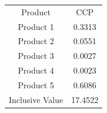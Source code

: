 \begin{tabular}{cc}
Product & CCP \\
Product 1 & 0.3313 \\
Product 2 & 0.0551 \\
Product 3 & 0.0027 \\
Product 4 & 0.0023 \\
Product 5 & 0.6086 \\
Inclusive Value & 17.4522 \\
\end{tabular}